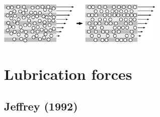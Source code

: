 \documentclass[12pt]{article}
\begin{document}
\begin{center}
\includegraphics[width=8cm]{order_with_undisturbed_shearflow.pdf} 
\end{center}




\newpage


\section{Lubrication forces}

\subsection*{Jeffrey (1992)}
\end{document}
